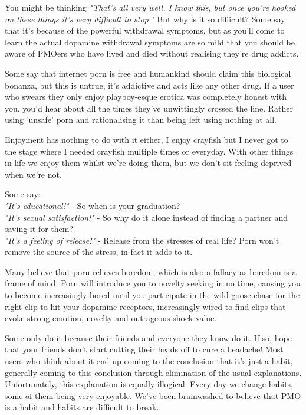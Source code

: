 \documentclass[easypeasy.tex]{subfiles}
\begin{document}
You might be thinking \textit{"That's all very well, I know this, but once you're hooked on these things it's very difficult to stop."} But why is it so difficult? Some say that it's because of the powerful withdrawal symptoms, but as you'll come to learn the actual dopamine withdrawal symptoms are so mild that you should be aware of PMOers who have lived and died without realising they're drug addicts.

Some say that internet porn is free and humankind should claim this biological bonanza, but this is untrue, it's addictive and acts like any other drug. If a user who swears they only enjoy playboy-esque erotica was completely honest with you, you'd hear about all the times they've unwittingly crossed the line. Rather using 'unsafe' porn and rationalising it than being left using nothing at all.

Enjoyment has nothing to do with it either, I enjoy crayfish but I never got to the stage where I needed crayfish multiple times or everyday. With other things in life we enjoy them whilst we're doing them, but we don't sit feeling deprived when we're not.

Some say:\\
  \textit{"It's educational!"} - So when is your graduation?\\
  \textit{"It's sexual satisfaction!"} - So why do it alone instead of finding a partner and saving it for them?\\
  \textit{"It's a feeling of release!"} - Release from the stresses of real life? Porn won't remove the source of the stress, in fact it adds to it.

Many believe that porn relieves boredom, which is also a fallacy as boredom is a frame of mind. Porn will introduce you to novelty seeking in no time, causing you to become increasingly bored until you participate in the wild goose chase for the right clip to hit your dopamine receptors, increasingly wired to find clips that evoke strong emotion, novelty and outrageous shock value.

Some only do it because their friends and everyone they know do it. If so, hope that your friends don't start cutting their heads off to cure a headache! Most users who think about it end up coming to the conclusion that it's just a habit, generally coming to this conclusion through elimination of the usual explanations. Unfortunately, this explanation is equally illogical. Every day we change habits, some of them being very enjoyable. We've been brainwashed to believe that PMO is a habit and habits are difficult to break.
\end{document}
